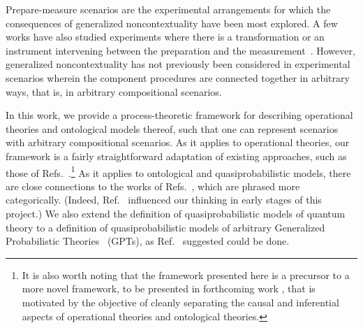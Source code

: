 \documentclass[onecolum,aps,groupedaddress,nofootinbib]{revtex4-2}
\begin{document}
Prepare-measure scenarios are the experimental arrangements for which the consequences of generalized noncontextuality have been most explored.
A few works have also studied experiments where there is a transformation or an instrument intervening between the preparation and the measurement~\cite{lillystone2019single,PP1,PP2,AWV,AWVrobust,Lostaglio2020contextualadvantage}.
However, generalized noncontextuality has not previously been considered in
experimental scenarios wherein the component procedures are connected together in arbitrary ways, that is, in arbitrary compositional scenarios.

In this work, we provide a process-theoretic \cite{coecke2015categorical,coecke2017picturing,selbyReconstruction,gogioso2017categorical} framework for describing operational theories and ontological models thereof, such that one can
 represent scenarios with arbitrary compositional scenarios.
 As it applies to operational theories, our framework is a fairly straightforward adaptation of existing approaches, such as those of Refs.~\cite{chiribella2010probabilistic,hardy2011reformulating,gogioso2017categorical,coecke2017picturing}.\footnote{It is also worth noting that the framework presented here is a precursor to a more novel framework, to be presented in
forthcoming work \cite{schmid2020unscrambling}, that is motivated by the objective of
 cleanly separating
the causal and inferential aspects of operational theories and ontological theories.}  As it applies to ontological and quasiprobabilistic models, there are close connections to the works of Refs.~\cite{van2017quantum,gheorghiu2019ontological}, which are phrased more categorically.
 (Indeed, Ref.~\cite{van2017quantum} influenced our thinking in early stages of this project.)
We also extend the definition of quasiprobabilistic models of quantum theory to a definition of quasiprobabilistic models of arbitrary Generalized Probabilistic Theories~\cite{hardy2001quantum,barrett2007,chiribella2010probabilistic,hardy2011reformulating} (GPTs), as Ref.~\cite{van2017quantum} suggested could be done.
\end{document}
